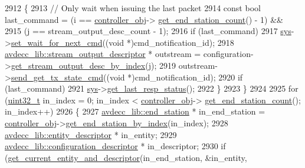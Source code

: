 \begin{DoxyCode}
2912         \{
2913             \textcolor{comment}{// Only wait when issuing the last packet}
2914             \textcolor{keyword}{const} \textcolor{keywordtype}{bool} last\_command = (i == \hyperlink{classcmd__line_af0a7784509e5bf1210a2aa19cea5df70}{controller\_obj}->
      \hyperlink{classavdecc__lib_1_1controller_ab5ddf7b4a9718fe3e821289141f44485}{get\_end\_station\_count}() - 1) &&
2915                                       (j == stream\_output\_desc\_count - 1);
2916             \textcolor{keywordflow}{if} (last\_command)
2917                 \hyperlink{classcmd__line_a485db4800e331cb4052c447fdf5d154e}{sys}->\hyperlink{classavdecc__lib_1_1system_a26b769584f10225077da47583edda33e}{set\_wait\_for\_next\_cmd}((\textcolor{keywordtype}{void} *)cmd\_notification\_id);
2918             \hyperlink{classavdecc__lib_1_1stream__output__descriptor}{avdecc\_lib::stream\_output\_descriptor} * outstream = 
      configuration->\hyperlink{classavdecc__lib_1_1configuration__descriptor_a300ea5957342e2e9579318135da02856}{get\_stream\_output\_desc\_by\_index}(j);
2919             outstream->\hyperlink{classavdecc__lib_1_1stream__output__descriptor_a375f5a65c3267d9eaa2b92496d0c2c92}{send\_get\_tx\_state\_cmd}((\textcolor{keywordtype}{void} *)cmd\_notification\_id);
2920             \textcolor{keywordflow}{if} (last\_command)
2921                 \hyperlink{classcmd__line_a485db4800e331cb4052c447fdf5d154e}{sys}->\hyperlink{classavdecc__lib_1_1system_aa63e8d1a4e51f695cdcccc9340922407}{get\_last\_resp\_status}();
2922         \}
2923     \}
2924 
2925     \textcolor{keywordflow}{for} (\hyperlink{parse_8c_a6eb1e68cc391dd753bc8ce896dbb8315}{uint32\_t} in\_index = 0; in\_index < \hyperlink{classcmd__line_af0a7784509e5bf1210a2aa19cea5df70}{controller\_obj}->
      \hyperlink{classavdecc__lib_1_1controller_ab5ddf7b4a9718fe3e821289141f44485}{get\_end\_station\_count}(); in\_index++)
2926     \{
2927         \hyperlink{classavdecc__lib_1_1end__station}{avdecc\_lib::end\_station} * in\_end\_station = 
      \hyperlink{classcmd__line_af0a7784509e5bf1210a2aa19cea5df70}{controller\_obj}->\hyperlink{classavdecc__lib_1_1controller_a2a8ec1205ea0d5fdd6f833285257d0d0}{get\_end\_station\_by\_index}(in\_index);
2928         \hyperlink{classavdecc__lib_1_1entity__descriptor}{avdecc\_lib::entity\_descriptor} * in\_entity;
2929         \hyperlink{classavdecc__lib_1_1configuration__descriptor}{avdecc\_lib::configuration\_descriptor} * in\_descriptor;
2930         \textcolor{keywordflow}{if} (\hyperlink{classcmd__line_aa22ed7f036749918eb875043f10060c9}{get\_current\_entity\_and\_descriptor}(in\_end\_station, &in\_entity, 

\end{DoxyCode}
